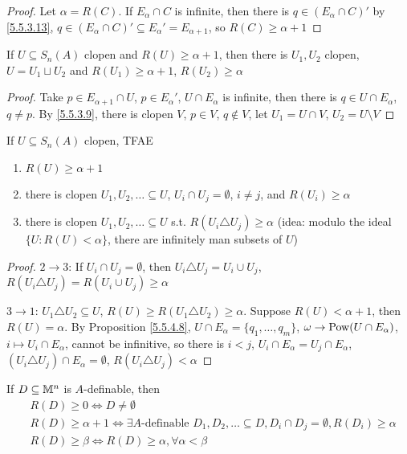 \documentclass[11pt]{article}
\begin{document}
\begin{proof}
Let \(\alpha=R(C)\). If \(E_\alpha\cap C\) is infinite, then there is \(q\in(E_\alpha\cap C)'\) by \ref{5.5.3.13},
\(q\in(E_\alpha\cap C)'\subseteq E_\alpha'=E_{\alpha+1}\), so \(R(C)\ge\alpha+1\)
\end{proof}

\begin{lemma}[]
\label{5.5.4.9}
If \(U\subseteq S_n(A)\) clopen and \(R(U)\ge\alpha+1\), then there is \(U_1,U_2\) clopen, \(U=U_1\sqcup U_2\)
and \(R(U_1)\ge\alpha+1\), \(R(U_2)\ge\alpha\)
\end{lemma}

\begin{proof}
Take \(p\in E_{\alpha+1}\cap U\), \(p\in E_\alpha'\), \(U\cap E_\alpha\) is infinite, then there
is \(q\in U\cap E_\alpha\), \(q\neq p\). By \ref{5.5.3.9}, there is clopen \(V\), \(p\in V\), \(q\notin V\),
let \(U_1=U\cap V\), \(U_2=U\setminus V\)
\end{proof}

\begin{proposition}[]
If \(U\subseteq S_n(A)\) clopen, TFAE
\begin{enumerate}
\item \(R(U)\ge\alpha+1\)
\item there is clopen \(U_1,U_2,\dots\subseteq U\), \(U_i\cap U_j=\emptyset\), \(i\neq j\),  and \(R(U_i)\ge\alpha\)
\item there is clopen \(U_1,U_2,\dots\subseteq U\) s.t. \(R(U_i\triangle U_j)\ge\alpha\) (idea: modulo the ideal \(\{U:R(U)<\alpha\}\),
there are infinitely man subsets of \(U\))
\end{enumerate}
\end{proposition}

\begin{proof}
\(2\to 3\): If \(U_i\cap U_j=\emptyset\), then \(U_i\triangle U_j=U_i\cup U_j\), \(R(U_i\triangle U_j)=R(U_i\cup U_j)\ge\alpha\)

\(3\to 1\): \(U_1\triangle U_2\subseteq U\), \(R(U)\ge R(U_1\triangle U_2)\ge\alpha\). Suppose \(R(U)<\alpha+1\), then \(R(U)=\alpha\). By
Proposition \ref{5.5.4.8}, \(U\cap E_\alpha=\{q_1,\dots,q_m\}\), \(\omega\to\operatorname{Pow}(U\cap E_\alpha)\), \(i\mapsto U_i\cap E_\alpha\), cannot be
infinitive, so there is \(i<j\), \(U_i\cap E_\alpha=U_j\cap E_\alpha\), \((U_i\triangle U_j)\cap E_\alpha=\emptyset\), \(R(U_i\triangle U_j)<\alpha\)
\end{proof}

If \(D\subseteq\mathbb{M}^n\) is \(A\)-definable, then
\begin{align*}
&R(D)\ge 0\Leftrightarrow D\neq\emptyset\\
&R(D)\ge\alpha+1\Leftrightarrow\exists A\text{-definable }D_1,D_2,\dots\subseteq D,D_i\cap D_j=\emptyset,R(D_i)\ge\alpha\\
&R(D)\ge\beta\Leftrightarrow R(D)\ge\alpha,\forall\alpha<\beta
\end{align*}
\end{document}
